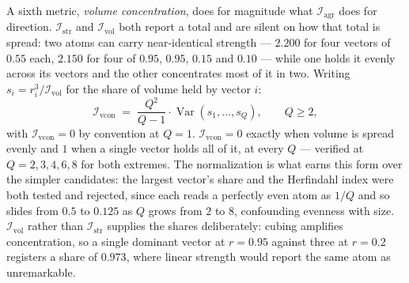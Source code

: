\documentclass[12pt, a4paper]{article}
\begin{document}
A sixth metric, \emph{volume concentration}, does for magnitude what $\mathcal{I}_{\mathrm{agr}}$ does
for direction. $\mathcal{I}_{\mathrm{str}}$ and $\mathcal{I}_{\mathrm{vol}}$ both
report a total and are silent on how that total is spread: two atoms can carry near-identical strength --- $2.200$ for four vectors of $0.55$ each, $2.150$ for four of $0.95$, $0.95$, $0.15$ and $0.10$ --- while one holds it evenly across its vectors and the other concentrates most of it in two. Writing $s_i = r_i^3 /
\mathcal{I}_{\mathrm{vol}}$ for the share of volume held by vector
$i$:
\begin{equation}
    \mathcal{I}_{\mathrm{vcon}} \;=\;
    \frac{Q^2}{Q-1}\cdot\operatorname{Var}(s_1,\ldots,s_Q),
    \qquad Q\ge 2,
    \label{eq:volume_concentration}
\end{equation}
with $\mathcal{I}_{\mathrm{vcon}}=0$ by convention at $Q=1$.
$\mathcal{I}_{\mathrm{vcon}}=0$ exactly when volume is spread evenly and $1$
when a single vector holds all of it, at every $Q$ --- verified at
$Q=2,3,4,6,8$ for both extremes. The normalization is what earns this
form over the simpler candidates: the largest vector's share and the
Herfindahl index were both tested and rejected, since each reads a
perfectly even atom as $1/Q$ and so slides from $0.5$ to $0.125$ as
$Q$ grows from $2$ to $8$, confounding evenness with size.
$\mathcal{I}_{\mathrm{vol}}$ rather than $\mathcal{I}_{\mathrm{str}}$ supplies
the shares deliberately: cubing amplifies concentration, so a single
dominant vector at $r=0.95$ against three at $r=0.2$ registers a
share of $0.973$, where linear strength would report the same atom
as unremarkable.
\end{document}

